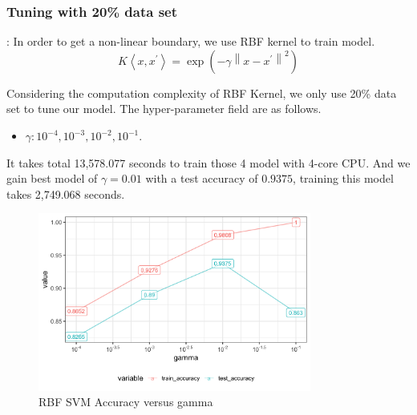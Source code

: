 \documentclass[8pt]{beamer}
\begin{document}
\subsubsection{Tuning with 20\% data set}
\begin{frame}[allowframebreaks]{\secname : \subsecname}{\subsubsecname}
In order to get a non-linear boundary, we use RBF kernel to train model.
$$
K\left\langle x, x^{\prime}\right\rangle=\exp \left(-\gamma\left\|x-x^{\prime}\right\|^{2}\right) 
$$

Considering the computation complexity of RBF Kernel, we only use 20\% data set to tune our model. The hyper-parameter field are as follows.
\begin{itemize}
  \item $\gamma:10^{-4},10^{-3},10^{-2},10^{-1}$.
\end{itemize}

\framebreak
It takes total 13,578.077 seconds to train those 4 model with 4-core CPU. And we gain best model of $\gamma=0.01$ with a test accuracy of $0.9375$, training this model takes 2,749.068 seconds.
\begin{figure}[htbp]
\centerline{\includegraphics[width=0.8\textwidth]{figure/RBF SVM Accuracy versus gamma.png}}
\caption{RBF SVM Accuracy versus gamma}
\label{RBF SVM Accuracy versus gamma}
\vspace{-1.5em}
\end{figure}
\end{frame}
\end{document}
